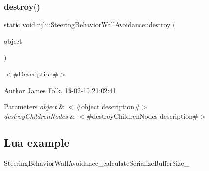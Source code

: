 \subsubsection{\texorpdfstring{destroy()}{destroy()}}
{\footnotesize\ttfamily static \mbox{\hyperlink{_thread_8h_af1e856da2e658414cb2456cb6f7ebc66}{void}} njli\+::\+Steering\+Behavior\+Wall\+Avoidance\+::destroy (\begin{DoxyParamCaption}\item[{\mbox{\hyperlink{classnjli_1_1_steering_behavior_wall_avoidance}{Steering\+Behavior\+Wall\+Avoidance}} $\ast$}]{object }\end{DoxyParamCaption})\hspace{0.3cm}{\ttfamily [static]}}



$<$\#\+Description\#$>$ 

\begin{DoxyAuthor}{Author}
James Folk, 16-\/02-\/10 21\+:02\+:41
\end{DoxyAuthor}

\begin{DoxyParams}{Parameters}
{\em object} & $<$\#object description\#$>$ \\
\hline
{\em destroy\+Children\+Nodes} & $<$\#destroy\+Children\+Nodes description\#$>$\\
\hline
\end{DoxyParams}
\hypertarget{classnjli_1_1_steering_behavior_wander_ex1}{}\subsection{Lua example}\label{classnjli_1_1_steering_behavior_wander_ex1}

\begin{DoxyCodeInclude}
\end{DoxyCodeInclude}
Steering\+Behavior\+Wall\+Avoidance\+\_\+calculate\+Serialize\+Buffer\+Size\+\_\+ \mbox{\label{classnjli_1_1_steering_behavior_wall_avoidance_ad0611cffe1596661f9ac36ccca8226fb}} 
